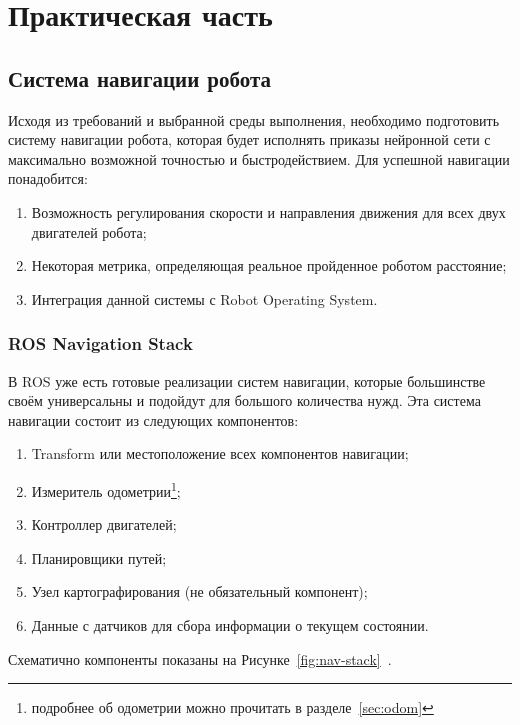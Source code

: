 \chapter{Практическая часть}\label{ch:ch3}

\section{Система навигации робота}\label{sec:ch3/sect1}
Исходя из требований и выбранной среды выполнения, необходимо подготовить систему навигации робота, которая будет исполнять приказы нейронной сети с максимально возможной точностью и быстродействием. Для успешной навигации понадобится:
\begin{enumerate}[beginpenalty=10000] %
  \item Возможность регулирования скорости и направления движения для всех двух двигателей робота;
  \item Некоторая метрика, определяющая реальное пройденное роботом расстояние;
  \item Интеграция данной системы с Robot Operating System.
\end{enumerate}

\subsection{ROS Navigation Stack}
В ROS уже есть готовые реализации систем навигации, которые большинстве своём универсальны и подойдут для большого количества нужд. Эта система навигации состоит из следующих компонентов:

\begin{enumerate}[beginpenalty=10000] %
  \item Transform или местоположение всех компонентов навигации;
  \item Измеритель одометрии\footnote{подробнее об одометрии можно прочитать в разделе~\cref{sec:odom}};
  \item Контроллер двигателей;
  \item Планировщики путей;
  \item Узел картографирования (не обязательный компонент);
  \item Данные с датчиков для сбора информации о текущем состоянии.
\end{enumerate}

Схематично компоненты показаны на Рисунке~\cref{fig:nav-stack}~\cite{nav-stack}.

